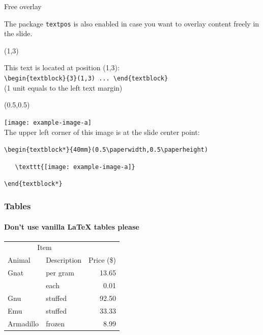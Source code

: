 \documentclass[11pt,aspectratio=169]{beamer}
\begin{document}
\begin{frame}[fragile,t]{Free overlay}

	The package \verb+textpos+ is also enabled in case you want to overlay content freely in the slide.

	\begin{textblock}{18}(1,3)
		{\tiny \color{accentcolor}
		This text is located at position (1,3):\\
		\verb+\begin{textblock}{3}(1,3) ... \end{textblock}+ \\
		(1 unit equals to the left text margin)\par}
	\end{textblock}

	\begin{textblock*}{60mm}(0.5\paperwidth,0.5\paperheight)
		{\tiny \color{accentcolor}
		\texttt{[image: example-image-a]}\\[2mm]
		The upper left corner of this image is at the slide center point:\par
		\verb+\begin{textblock*}{40mm}(0.5\paperwidth,0.5\paperheight)+\par
		\verb+   \texttt{[image: example-image-a]}+\par
		\verb+\end{textblock*}+\par }
	\end{textblock*}	

\end{frame}

\begin{frame}

	\frametitle{Tables}
	\framesubtitle{Don't use vanilla \LaTeX{}  tables please}
	
		\begin{center}
			\begin{tabular}{@{}llr@{}}
				\toprule\multicolumn{2}{c}{Item} \\
				\cmidrule(r){1-2}Animal & Description & Price (\$)\\
				\midrule
				Gnat  & per gram  & 13.65 \\
				& each      & 0.01 \\
				Gnu   & stuffed   & 92.50 \\
				Emu   & stuffed   & 33.33 \\
				Armadillo & frozen & 8.99 \\
				\bottomrule
			\end{tabular}
		\end{center}

\end{frame}
\end{document}
